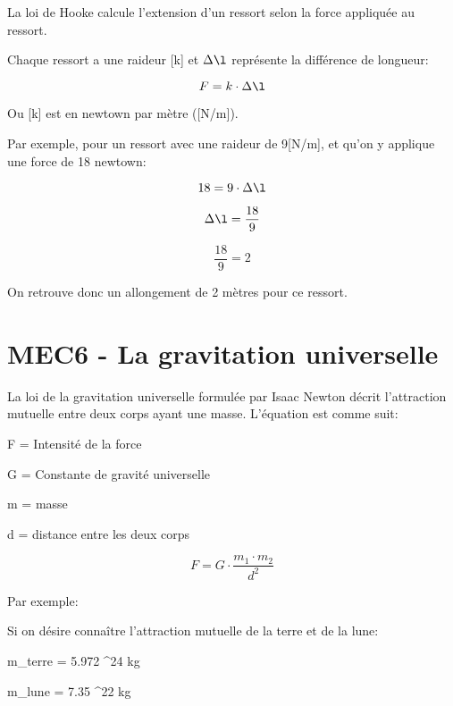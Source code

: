 \documentclass{article}
\begin{document}
La loi de Hooke calcule l'extension d'un ressort selon la force appliquée au ressort.

Chaque ressort a une raideur [k] et \(\Delta\l\) représente la différence de longueur:

\begin{equation}
  F = k \cdot \Delta\l
\end{equation}

Ou [k] est en newtown par mètre ([N/m]).

Par exemple, pour un ressort avec une raideur de 9[N/m], et qu'on y applique une force de 18 newtown:

\begin{equation}
  18 = 9 \cdot \Delta\l
\end{equation}

\begin{equation}
  \Delta\l = \frac{18}{9}
\end{equation}

\begin{equation}
  \frac{18}{9} = 2
\end{equation}

On retrouve donc un allongement de 2 mètres pour ce ressort.

\section{MEC6 - La gravitation universelle}

La loi de la gravitation universelle formulée par Isaac Newton décrit l'attraction mutuelle entre deux corps ayant une masse.
\newline
\newline
L'équation est comme suit:

F = Intensité de la force

G = Constante de gravité universelle

m = masse

d = distance entre les deux corps

\begin{equation}
  F = G \cdot \frac{m_1 \cdot m_2}{d^2}
\end{equation}

Par exemple:

Si on désire connaître l'attraction mutuelle de la terre et de la lune:
\newline

m_{terre} = 5.972 ^{24} kg

m_{lune} = 7.35 ^{22} kg
\end{document}
